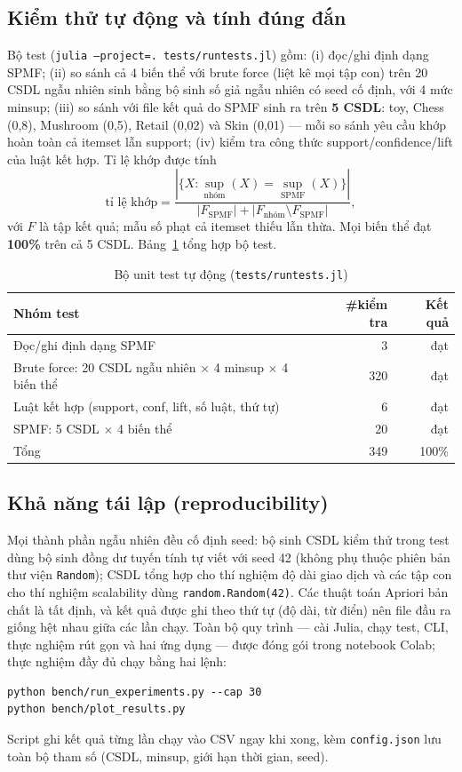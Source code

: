 \documentclass[10pt,twocolumn,letterpaper]{article}
\renewcommand{\sup}{\operatorname{sup}}
\begin{document}
\subsection{Kiểm thử tự động và tính đúng đắn}
Bộ test (\texttt{julia --project=. tests/runtests.jl}) gồm: (i) đọc/ghi định dạng SPMF; (ii) so sánh cả 4 biến thể với brute force (liệt kê mọi tập con) trên 20 CSDL ngẫu nhiên sinh bằng bộ sinh số giả ngẫu nhiên có seed cố định, với 4 mức minsup; (iii) so sánh với file kết quả do SPMF sinh ra trên \textbf{5 CSDL}: toy, Chess (0,8), Mushroom (0,5), Retail (0,02) và Skin (0,01) — mỗi so sánh yêu cầu khớp hoàn toàn cả itemset lẫn support; (iv) kiểm tra công thức support/confidence/lift của luật kết hợp. Tỉ lệ khớp được tính
\begin{equation}
\text{tỉ lệ khớp}=\frac{|\{X : \sup_{\text{nhóm}}(X)=\sup_{\text{SPMF}}(X)\}|}{|F_{\text{SPMF}}|+|F_{\text{nhóm}}\setminus F_{\text{SPMF}}|},
\end{equation}
với $F$ là tập kết quả; mẫu số phạt cả itemset thiếu lẫn thừa. Mọi biến thể đạt \textbf{100\%} trên cả 5 CSDL. Bảng~\ref{tab:tests} tổng hợp bộ test.

\begin{table}[t]
\centering
\caption{Bộ unit test tự động (\texttt{tests/runtests.jl})}
\label{tab:tests}
\footnotesize
\begin{tabular}{@{}>{\raggedright\arraybackslash}p{4.3cm}rr@{}}
\toprule
Nhóm test & \#kiểm tra & Kết quả \\ \midrule
Đọc/ghi định dạng SPMF & 3 & đạt \\
Brute force: 20 CSDL ngẫu nhiên $\times$ 4 minsup $\times$ 4 biến thể & 320 & đạt \\
Luật kết hợp (support, conf, lift, số luật, thứ tự) & 6 & đạt \\
SPMF: 5 CSDL $\times$ 4 biến thể & 20 & đạt \\ \midrule
Tổng & 349 & 100\% \\
\bottomrule
\end{tabular}
\end{table}

\subsection{Khả năng tái lập (reproducibility)}
Mọi thành phần ngẫu nhiên đều cố định seed: bộ sinh CSDL kiểm thử trong test dùng bộ sinh đồng dư tuyến tính tự viết với seed 42 (không phụ thuộc phiên bản thư viện \texttt{Random}); CSDL tổng hợp cho thí nghiệm độ dài giao dịch và các tập con cho thí nghiệm scalability dùng \texttt{random.Random(42)}. Các thuật toán Apriori bản chất là tất định, và kết quả được ghi theo thứ tự (độ dài, từ điển) nên file đầu ra giống hệt nhau giữa các lần chạy. Toàn bộ quy trình — cài Julia, chạy test, CLI, thực nghiệm rút gọn và hai ứng dụng — được đóng gói trong notebook Colab; thực nghiệm đầy đủ chạy bằng hai lệnh:
\begin{verbatim}
python bench/run_experiments.py --cap 30
python bench/plot_results.py
\end{verbatim}
\noindent Script ghi kết quả từng lần chạy vào CSV ngay khi xong, kèm \texttt{config.json} lưu toàn bộ tham số (CSDL, minsup, giới hạn thời gian, seed).
\end{document}
